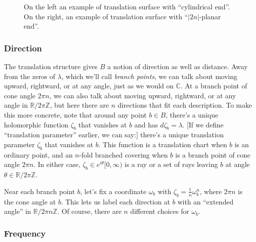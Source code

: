 \documentclass{article}
\theoremstyle{definition}
\newcommand{\Z}{\mathbb{Z}}
\newcommand{\R}{\mathbb{R}}
\newcommand{\C}{\mathbb{C}}
\begin{document}
\begin{figure}[ht]
    \centering
    \caption{On the left an example of translation surface with ``cylindrical end''. On the right, an example of translation surface with  ``$|2n|$-planar end''. }
    \label{fig:translation_surface}
\end{figure}

\subsubsection{Direction}\label{transl:dir}
The translation structure gives $B$ a notion of direction as well as distance. Away from the zeros of $\lambda$, which we'll call {\em branch points}, we can talk about moving upward, rightward, or at any angle, just as we would on $\C$. At a branch point of cone angle $2\pi n$, we can also talk about moving upward, rightward, or at any angle in $\R/2\pi\Z$, but here there are $n$ directions that fit each description. To make this more concrete, note that around any point $b \in B$, there's a unique holomorphic function $\zeta_b$ that vanishes at $b$ and has $d\zeta_b = \lambda$. \textcolor{VioletRed}{[If we define ``translation parameter'' earlier, we can say:] there's a unique translation parameter $\zeta_b$ that vanishes at $b$.} This function is a translation chart when $b$ is an ordinary point, and an $n$-fold branched covering when $b$ is a branch point of cone angle $2\pi n$. In either case, $\zeta_b \in e^{i\theta} [0, \infty)$ is a ray or a set of rays leaving $b$ at angle $\theta \in \R/2\pi\Z$.

Near each branch point $b$, let's fix a coordinate $\omega_b$ with $\zeta_b = \tfrac{1}{n} \omega_b^n$, where $2\pi n$ is the cone angle at $b$. This lets us label each direction at $b$ with an ``extended angle'' in $\R/2\pi n\Z$. Of course, there are $n$ different choices for $\omega_b$.

\subsubsection{Frequency}\label{transl-freq}
\end{document}
